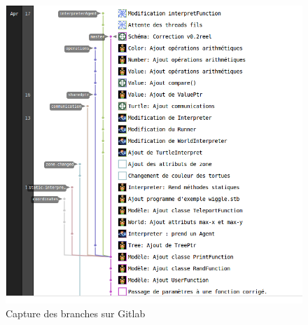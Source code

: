 \begin{figure}[h]
\caption{\label{branche} Capture des branches sur Gitlab}
\includegraphics[scale=0.35]{doc/report/uml/network-v3.png}
\end{figure}
